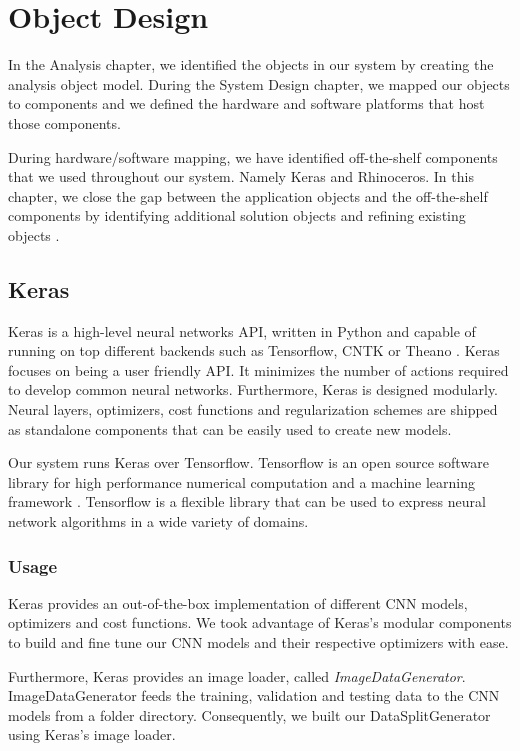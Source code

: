 \chapter{Object Design}\label{ch:object_design}
In the Analysis chapter, we identified the objects in our system by creating the analysis object model. During the System Design chapter, we mapped our objects to components and we defined the hardware and software platforms that host those components.

During hardware/software mapping, we have identified off-the-shelf components that we used throughout our system. Namely Keras and Rhinoceros. In this chapter, we close the gap between the application objects and the off-the-shelf components by identifying additional solution objects and refining existing objects \cite{bruegge2004object}.

\section{Keras}
Keras is a high-level neural networks API, written in Python and capable of running on top different backends such as Tensorflow, CNTK or Theano \cite{chollet2015keras}. Keras focuses on being a user friendly API. It minimizes the number of actions required to develop common neural networks. Furthermore, Keras is designed modularly. Neural layers, optimizers, cost functions and regularization schemes are shipped as standalone components that can be easily used to create new models.

Our system runs Keras over Tensorflow. Tensorflow is an open source software library for high performance numerical computation and a machine learning framework \cite{tensorflow2015-whitepaper}. Tensorflow is a flexible library that can be used to express neural network algorithms in a wide variety of domains.

\subsection{Usage}
Keras provides an out-of-the-box implementation of different CNN models, optimizers and cost functions. We took advantage of Keras's modular components to build and fine tune our CNN models and their respective optimizers with ease.

Furthermore, Keras provides an image loader, called \textit{ImageDataGenerator}. ImageDataGenerator feeds the training, validation and testing data to the CNN models from a folder directory. Consequently, we built our DataSplitGenerator using Keras's image loader.


